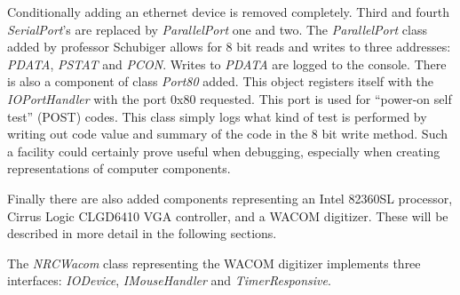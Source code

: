 \begin{codeblock}
    
\end{codeblock}


Conditionally adding an ethernet device is removed completely. Third and fourth
\emph{SerialPort}'s are replaced by \emph{ParallelPort} one and two. The
\emph{ParallelPort} class added by professor Schubiger allows for 8 bit reads
and writes to three addresses: \emph{PDATA}, \emph{PSTAT} and \emph{PCON}.
Writes to \emph{PDATA} are logged to the console. There is also a component of
class \emph{Port80} added. This object registers itself with the
\emph{IOPortHandler} with the port 0x80 requested. This port is used for
``power-on self test'' (POST) codes. This class simply logs what kind of test is
performed by writing out code value and summary of the code in the 8 bit write
method. Such a facility could certainly prove useful when debugging, especially
when creating representations of computer components. 

Finally there are also added components representing an Intel 82360SL
processor, Cirrus Logic CLGD6410 VGA controller, and a WACOM digitizer. These
will be described in more detail in the following sections.


The \emph{NRCWacom} class representing the WACOM digitizer implements three
interfaces: \emph{IODevice}, \emph{IMouseHandler} and \emph{TimerResponsive}.

